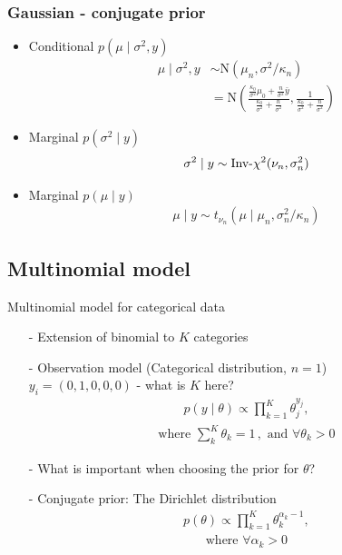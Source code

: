 \documentclass[10pt]{beamer}
\begin{document}
\begin{frame}
 \frametitle{Gaussian - conjugate prior}

  \begin{itemize}
 \item Conditional $p(\mu \mid \sigma^2,y)$
    \begin{align*}
     \mu \mid \sigma^2,y & \sim \mathrm{N}(\mu_n,\sigma^2/\kappa_n)\\
     & =  \mathrm{N}\left(\frac{\frac{\kappa_0}{\sigma^2}\mu_0+\frac{n}{\sigma^2}\bar{y}}{\frac{\kappa_0}{\sigma^2}+\frac{n}{\sigma^2}},\frac{1}{\frac{\kappa_0}{\sigma^2}+\frac{n}{\sigma^2}}\right)
    \end{align*}
  \vspace{-2mm}
  \pause
 \item Marginal $p(\sigma^2 \mid y)$
  \begin{align*}
      \sigma^2 \mid y \sim \Invchi2(\nu_n,\sigma_n^2)
   \end{align*}
    \vspace{-6mm}
  \pause
  \item Marginal $p(\mu \mid y)$
   \begin{align*}
     \mu \mid y \sim t_{\nu_n}(\mu \mid \mu_n,\sigma_n^2/\kappa_n)
   \end{align*}
  \end{itemize}

\end{frame}


\subsection{Multinomial model}

\begin{frame}{Multinomial model for categorical data}

  \begin{itemize}
  \item[-] Extension of binomial to $K$ categories
  \item[-] Observation model (Categorical distribution, $n=1$)\\
  $y_i = (0,1,0,0,0)$ - {\color{uured} what is $K$ here?}
  \pause
    \begin{align*}
      p(y  \mid  \theta) \propto \prod_{k=1}^K \theta_j^{y_j},
    \end{align*}
    \begin{align*}
      \text{where } \sum_k^K \theta_k = 1\,, \text{ and } \forall \theta_k > 0
    \end{align*}
  \item[-] {\color{uured} What is important when choosing the prior for $\theta$?}
  \pause
  \item[-] Conjugate prior: The Dirichlet distribution
  \begin{align*}
    p(\theta) \propto \prod_{k=1}^K \theta_k^{\alpha_k-1},
  \end{align*}
  \begin{align*}
      \text{where } \forall \alpha_k > 0
  \end{align*}
  \end{itemize}
\end{frame}
\end{document}
